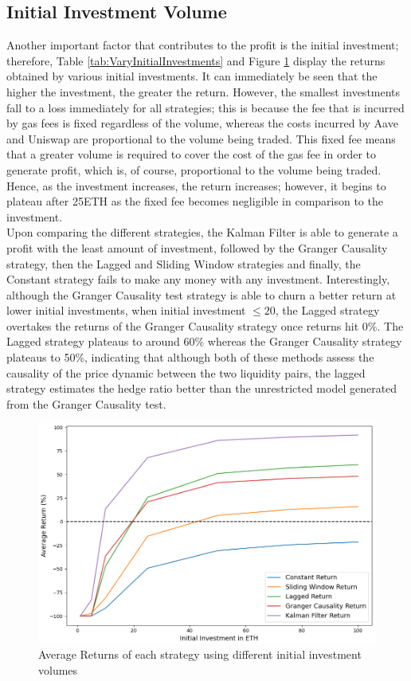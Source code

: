 \subsection{Initial Investment Volume}
Another important factor that contributes to the profit is the initial investment; therefore, Table \ref{tab:VaryInitialInvestments} and Figure \ref{fig:VaryInitialInvestments} display the returns obtained by various initial investments. It can immediately be seen that the higher the investment, the greater the return. However, the smallest investments fall to a loss immediately for all strategies; this is because the fee that is incurred by gas fees is fixed regardless of the volume, whereas the costs incurred by Aave and Uniswap are proportional to the volume being traded. This fixed fee means that a greater volume is required to cover the cost of the gas fee in order to generate profit, which is, of course, proportional to the volume being traded. Hence, as the investment increases, the return increases; however, it begins to plateau after 25ETH as the fixed fee becomes negligible in comparison to the investment.
\\[3mm]
Upon comparing the different strategies, the Kalman Filter is able to generate a profit with the least amount of investment, followed by the Granger Causality strategy, then the Lagged and Sliding Window strategies and finally, the Constant strategy fails to make any money with any investment. Interestingly, although the Granger Causality test strategy is able to churn a better return at lower initial investments, when initial investment $\leq 20$, the Lagged strategy overtakes the returns of the Granger Causality strategy once returns hit 0\%. The Lagged strategy plateaus to around 60\% whereas the Granger Causality strategy plateaus to 50\%, indicating that although both of these methods assess the causality of the price dynamic between the two liquidity pairs, the lagged strategy estimates the hedge ratio better than the unrestricted model generated from the Granger Causality test.

\begin{figure}[H]
    \centering
    \includegraphics[width=\linewidth]{evaluation/Images/VaryII.png}
    \caption{Average Returns of each strategy using different initial investment volumes}
    \label{fig:VaryInitialInvestments}
\end{figure}

